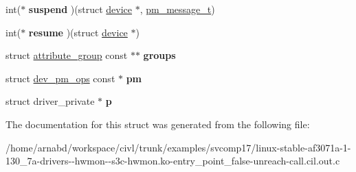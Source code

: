 \begin{DoxyCompactItemize}
\item 
\hypertarget{structdevice__driver_afb99121080f25776b7a0c3ed8f4ea0a1}{}int($\ast$ {\bfseries suspend} )(struct \hyperlink{structdevice}{device} $\ast$, \hyperlink{structpm__message}{pm\+\_\+message\+\_\+t})\label{structdevice__driver_afb99121080f25776b7a0c3ed8f4ea0a1}

\item 
\hypertarget{structdevice__driver_a59aca71111064c83d8de603c517e0a42}{}int($\ast$ {\bfseries resume} )(struct \hyperlink{structdevice}{device} $\ast$)\label{structdevice__driver_a59aca71111064c83d8de603c517e0a42}

\item 
\hypertarget{structdevice__driver_acdc26bd2e9eaea05c771b9879aa1e2ed}{}struct \hyperlink{structattribute__group}{attribute\+\_\+group} const $\ast$$\ast$ {\bfseries groups}\label{structdevice__driver_acdc26bd2e9eaea05c771b9879aa1e2ed}

\item 
\hypertarget{structdevice__driver_abb74575383a6fa8f9d1401ca9fa48234}{}struct \hyperlink{structdev__pm__ops}{dev\+\_\+pm\+\_\+ops} const $\ast$ {\bfseries pm}\label{structdevice__driver_abb74575383a6fa8f9d1401ca9fa48234}

\item 
\hypertarget{structdevice__driver_ab9d24a016ac5a983a84d050425654d59}{}struct driver\+\_\+private $\ast$ {\bfseries p}\label{structdevice__driver_ab9d24a016ac5a983a84d050425654d59}

\end{DoxyCompactItemize}


The documentation for this struct was generated from the following file\+:\begin{DoxyCompactItemize}
\item 
/home/arnabd/workspace/civl/trunk/examples/svcomp17/linux-\/stable-\/af3071a-\/1-\/130\+\_\+7a-\/drivers-\/-\/hwmon-\/-\/s3c-\/hwmon.\+ko-\/entry\+\_\+point\+\_\+false-\/unreach-\/call.\+cil.\+out.\+c\end{DoxyCompactItemize}
